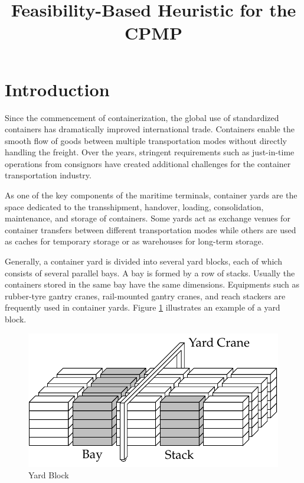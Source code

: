\documentclass{article}
\title{Feasibility-Based Heuristic for the CPMP}
\begin{document}
\maketitle







\section{Introduction}

Since the commencement of containerization, the global use of standardized containers has dramatically improved international trade. Containers enable the smooth flow of goods between multiple transportation modes without directly handling the freight. Over the years, stringent requirements such as just-in-time operations from consignors have created additional challenges for the container transportation industry.


As one of the key components of the maritime terminals, container yards are the space dedicated to the transshipment, handover, loading, consolidation, maintenance, and storage of containers.
Some yards act as exchange venues for container transfers between different transportation modes while others are used as caches for temporary storage or as warehouses for long-term storage.

Generally, a container yard is divided into several yard blocks, each of which consists of several parallel bays. A bay is formed by a row of stacks. Usually the containers stored in the same bay have the same dimensions. Equipments such as rubber-tyre gantry cranes, rail-mounted gantry cranes, and reach stackers are frequently used in container yards. Figure \ref{cpmp:fig:block} illustrates an example of a yard block.


\begin{figure}[htbp]
\centering
\includegraphics{figures/block.pdf}
\caption{Yard Block}
\label{cpmp:fig:block}
\end{figure}
\end{document}

